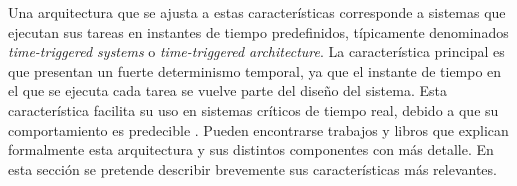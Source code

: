 Una arquitectura que se ajusta a estas características corresponde a sistemas que ejecutan sus tareas en instantes de tiempo predefinidos, típicamente denominados \textit{time-triggered systems} o \textit{time-triggered architecture}. La característica principal es que presentan un fuerte determinismo temporal, ya que el instante de tiempo en el que se ejecuta cada tarea se vuelve parte del diseño del sistema. Esta característica facilita su uso en sistemas críticos de tiempo real, debido a que su comportamiento es predecible \cite[p.~12]{pont2008patterns}. Pueden encontrarse trabajos \cite{kopetz2003time} \cite{kopetz1998time} y libros \cite{kopetz-2011} \cite{pont2008patterns} que explican formalmente esta arquitectura y sus distintos componentes con más detalle. En esta sección se pretende describir brevemente sus características más relevantes.






